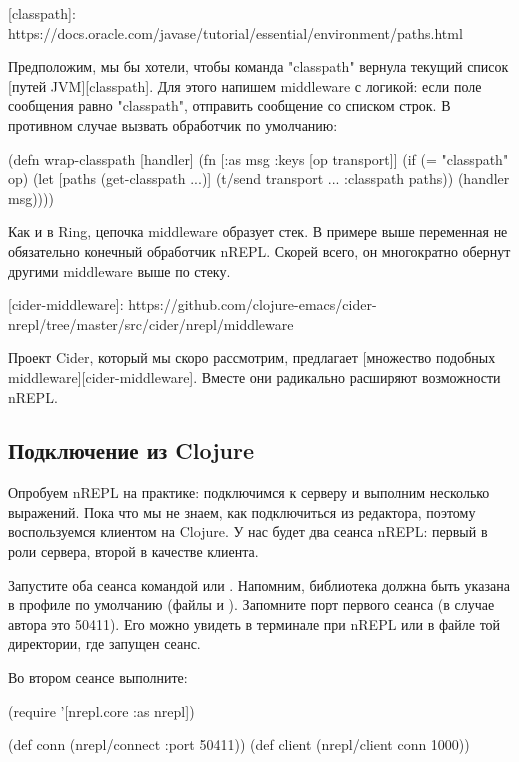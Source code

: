 [classpath]: https://docs.oracle.com/javase/tutorial/essential/environment/paths.html

Предположим, мы бы хотели, чтобы команда "classpath" вернула текущий список [путей JVM][classpath]. Для этого напишем middleware с логикой: если поле  сообщения равно "classpath", отправить сообщение со списком строк. В противном случае вызвать обработчик по умолчанию:

\begin{english}
  \begin{clojure}
(defn wrap-classpath [handler]
  (fn [{:as msg :keys [op transport]}]
    (if (= "classpath" op)
      (let [paths (get-classpath ...)]
        (t/send transport {... :classpath paths}))
      (handler msg))))
  \end{clojure}
\end{english}

Как и в Ring, цепочка middleware образует стек. В примере выше переменная  не обязательно конечный обработчик nREPL. Скорей всего, он многократно обернут другими middleware выше по стеку.

[cider-middleware]: https://github.com/clojure-emacs/cider-nrepl/tree/master/src/cider/nrepl/middleware

Проект Cider, который мы скоро рассмотрим, предлагает [множество подобных middleware][cider-middleware]. Вместе они радикально расширяют возможности nREPL.

\subsection{Подключение из Clojure}

Опробуем nREPL на практике: подключимся к серверу и выполним несколько выражений. Пока что мы не знаем, как подключиться из редактора, поэтому воспользуемся клиентом на Clojure. У нас будет два сеанса nREPL: первый в роли сервера, второй в качестве клиента.

Запустите оба сеанса командой  или . Напомним, библиотека  должна быть указана в профиле по умолчанию (файлы  и ). Запомните порт первого сеанса (в случае автора это 50411). Его можно увидеть в терминале при nREPL или в файле  той директории, где запущен сеанс.

Во втором сеансе выполните:

\begin{english}
  \begin{clojure}
(require '[nrepl.core :as nrepl])

(def conn (nrepl/connect :port 50411))
(def client (nrepl/client conn 1000))
  \end{clojure}
\end{english}

